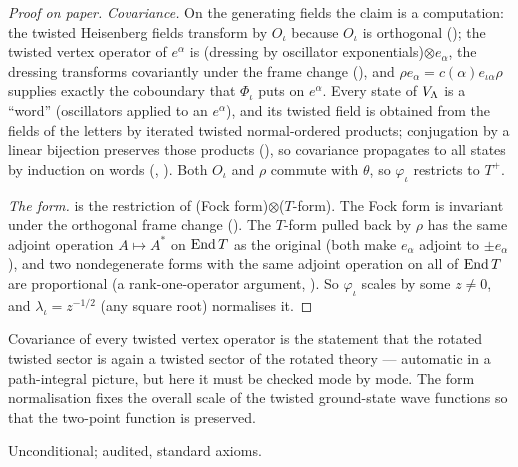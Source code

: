 \begin{proof}[Proof on paper]
\emph{Covariance.}  On the generating fields the claim is a computation: the twisted Heisenberg fields transform by
$O_\iota$ because $O_\iota$ is orthogonal (); the twisted vertex operator of $e^\alpha$ is
(dressing by oscillator exponentials)$\otimes e_\alpha$, the dressing transforms covariantly under the frame change
(), and $\rho e_\alpha=c(\alpha)e_{\iota\alpha}\rho$ supplies exactly the coboundary that
$\Phi_\iota$ puts on $e^\alpha$.  Every state of $V_{\Lambda}$ is a ``word'' (oscillators applied to an $e^\alpha$), and its
twisted field is obtained from the fields of the letters by iterated twisted normal-ordered products; conjugation by
a linear bijection preserves those products (), so covariance propagates to all states by
induction on words (, ).  Both $O_\iota$ and $\rho$ commute
with $\theta$, so $\varphi_\iota$ restricts to $T^+$.

\emph{The form.}   is the restriction of (Fock form)$\otimes$($T$-form).  The Fock form is invariant
under the orthogonal frame change ().  The $T$-form pulled back by $\rho$ has the same
adjoint operation $A\mapsto A^*$ on $\operatorname{End} T$ as the original (both make $e_\alpha$ adjoint to $\pm e_\alpha$), and two
nondegenerate forms with the same adjoint operation on all of $\operatorname{End} T$ are proportional (a rank-one-operator argument,
).  So $\varphi_\iota$ scales  by some $z\ne0$, and $\lambda_\iota=z^{-1/2}$ (any square root)
normalises it.
\end{proof}
\begin{physics}
Covariance of every twisted vertex operator is the statement that the rotated twisted sector is again a twisted
sector of the rotated theory --- automatic in a path-integral picture, but here it must be checked mode by mode.  The
form normalisation fixes the overall scale of the twisted ground-state wave functions so that the two-point function
is preserved.
\end{physics}
\begin{status}Unconditional; audited, standard axioms.\end{status}

